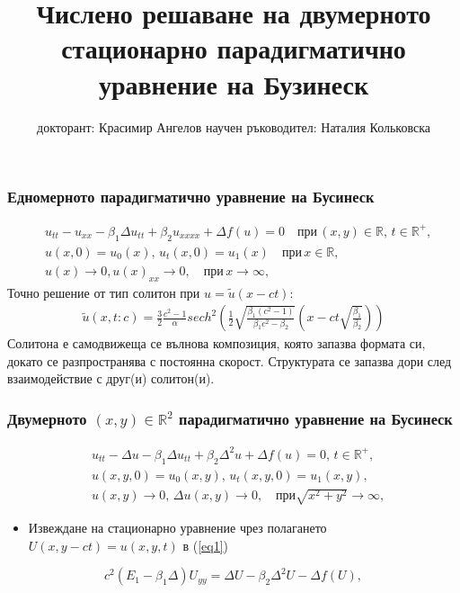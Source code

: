 \documentclass{beamer}
\title{Числено решаване на двумерното стационарно парадигматично уравнение на Бузинеск}
\author{докторант: Красимир Ангелов 
\newline \newline научен ръководител: Наталия Кольковска}
\newcommand{\RR}{\mathbb{R}}
\newcommand{\rf}[1]{(\ref{#1})}
\begin{document}
\begin{frame}
\titlepage
\end{frame}


\begin{frame}
\frametitle{ Едномерното парадигматично уравнение на Бусинеск }
\begin{align}
&u_{tt} - u_{xx} -\beta_1  \Delta u_{tt} +\beta_2 u_{xxxx} + \Delta f(u)=0   \quad \text{при} \,  (x,y) \in \RR, \, t\in\RR^+,\label{eq1D}
\\ \nonumber &u(x,0)=u_0(x), \, u_t(x,0)=u_1(x)   \quad\text{при} \, x \in \RR,
\\  &u(x) \rightarrow 0,  u(x)_{xx} \rightarrow 0 ,  \quad \text{при} \, x \rightarrow \infty, \label{eq1d1}
\end{align}
Точно решение от тип солитон при $u =\tilde u(x-ct)$:
\begin{align}
\tilde u(x,t:c) = \frac{3}{2} \frac{c^2-1}{\alpha}sech^2 \left( \frac{1}{2}  \sqrt{ \frac{\beta_1 (c^2-1)}{\beta_1 c^2-\beta_2}} (x-c t \sqrt{\frac{\beta_1}{\beta_2}} ) \right)
\end{align}
Солитона е самодвижеща се вълнова композиция, която запазва формата си, докато се разпространява с постоянна скорост. Структурата се запазва дори след взаимодействие с друг(и) солитон(и).
\end{frame}

\begin{frame}
\frametitle{ Двумерното $(x,y) \in \RR^2$ парадигматично уравнение на Бусинеск }
\begin{align}
&u_{tt} - \Delta u -\beta_1  \Delta u_{tt} +\beta_2 \Delta ^2 u + \Delta f(u)=0, \, t\in\RR^+,\label{eq1}
\\ \nonumber &u(x,y,0)=u_0(x,y), \, u_t(x,y,0)=u_1(x,y)  ,
\\  &u(x,y) \rightarrow 0, \,  \Delta u(x,y) \rightarrow 0 ,  \quad \text{при} \sqrt{x^2 + y^2} \rightarrow \infty, \label{eq11}
\end{align}
\begin{itemize}
  \item Извеждане на {\color{red}стационарно} уравнение чрез полагането $U(x,y-ct)=u(x,y,t)$ в \rf{eq1}
\end{itemize}
\color{red}
\begin{equation}
c^2 (E_1-\beta_1 \Delta) U_{yy} = \Delta U -\beta_2 \Delta^2 U - \Delta f(U),
\end{equation}

\end{frame}
\end{document}
